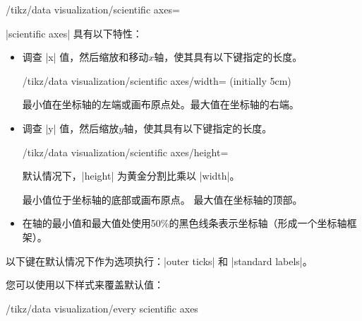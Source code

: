 \begin{key}{/tikz/data visualization/scientific axes=}

    |scientific axes| 具有以下特性：
    \begin{itemize}
        \item 调查 |x| 值，然后缩放和移动$x$轴，使其具有以下键指定的长度。
            \begin{key}{/tikz/data visualization/scientific axes/width= (initially 5cm)} %
            \end{key}
            最小值在坐标轴的左端或画布原点处。最大值在坐标轴的右端。
        \item 调查 |y| 值，然后缩放$y$轴，使其具有以下键指定的长度。
            \begin{key}{/tikz/data visualization/scientific axes/height=} %

                默认情况下，|height| 为黄金分割比乘以 |width|。
            \end{key}
            最小值位于坐标轴的底部或画布原点。 最大值在坐标轴的顶部。
        \item 在轴的最小值和最大值处使用50\%的黑色线条表示坐标轴（形成一个坐标轴框架）。
    \end{itemize}


    以下键在默认情况下作为选项执行：|outer ticks| 和 |standard labels|。


    您可以使用以下样式来覆盖默认值：

    \begin{stylekey}{/tikz/data visualization/every scientific axes}
    \end{stylekey}
\end{key}

